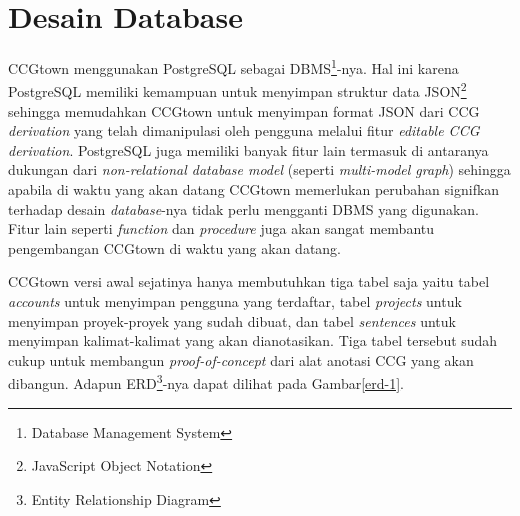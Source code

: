 \section{Desain Database}
CCGtown menggunakan PostgreSQL sebagai
DBMS\footnote{Database Management System}-nya.
Hal ini karena PostgreSQL memiliki kemampuan untuk menyimpan struktur data
JSON\footnote{JavaScript Object Notation} sehingga memudahkan CCGtown untuk menyimpan
format JSON dari CCG \textit{derivation} yang telah dimanipulasi oleh pengguna melalui
fitur \textit{editable CCG derivation}.
PostgreSQL juga memiliki banyak fitur lain termasuk di antaranya dukungan
dari \textit{non-relational database model} (seperti \textit{multi-model graph})
sehingga apabila di waktu yang akan datang CCGtown memerlukan perubahan signifkan
terhadap desain \textit{database}-nya tidak perlu mengganti DBMS yang digunakan.
Fitur lain seperti \textit{function} dan \textit{procedure} juga akan sangat membantu
pengembangan CCGtown di waktu yang akan datang.

CCGtown versi awal sejatinya hanya membutuhkan tiga tabel saja yaitu tabel
\textit{accounts} untuk menyimpan pengguna yang terdaftar, tabel
\textit{projects} untuk menyimpan proyek-proyek yang sudah dibuat, dan tabel
\textit{sentences} untuk menyimpan kalimat-kalimat yang akan dianotasikan.
Tiga tabel tersebut sudah cukup untuk membangun \textit{proof-of-concept} dari
alat anotasi CCG yang akan dibangun. Adapun
ERD\footnote{Entity Relationship Diagram}-nya dapat dilihat pada Gambar\ref{erd-1}.

